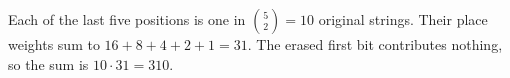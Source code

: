 Each of the last five positions is one in $\binom52=10$ original strings. Their place weights sum to $16+8+4+2+1=31$. The erased first bit contributes nothing, so the sum is $10\cdot31=\boxed{310}$.
